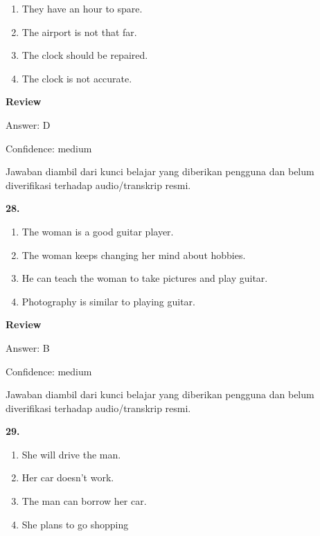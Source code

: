 \documentclass[12pt]{article}
\begin{document}
\begin{enumerate}[label=(\Alph*),leftmargin=*,itemsep=0.2em]
\item They have an hour to spare.
\item The airport is not that far.
\item The clock should be repaired.
\item The clock is not accurate.
\end{enumerate}
\par
\begingroup
\setlength{\parskip}{0pt}
\setlength{\parindent}{0pt}
\textbf{Review}\par
Answer: D\par
Confidence: medium\par
Jawaban diambil dari kunci belajar yang diberikan pengguna dan belum diverifikasi terhadap audio/transkrip resmi.\par
\endgroup
\par
\vspace{0.25\baselineskip}
\noindent\textbf{28.}
\begin{enumerate}[label=(\Alph*),leftmargin=*,itemsep=0.2em]
\item The woman is a good guitar player.
\item The woman keeps changing her mind about hobbies.
\item He can teach the woman to take pictures and play guitar.
\item Photography is similar to playing guitar.
\end{enumerate}
\par
\begingroup
\setlength{\parskip}{0pt}
\setlength{\parindent}{0pt}
\textbf{Review}\par
Answer: B\par
Confidence: medium\par
Jawaban diambil dari kunci belajar yang diberikan pengguna dan belum diverifikasi terhadap audio/transkrip resmi.\par
\endgroup
\par
\vspace{0.25\baselineskip}
\noindent\textbf{29.}
\begin{enumerate}[label=(\Alph*),leftmargin=*,itemsep=0.2em]
\item She will drive the man.
\item Her car doesn't work.
\item The man can borrow her car.
\item She plans to go shopping
\end{enumerate}
\par
\end{document}
